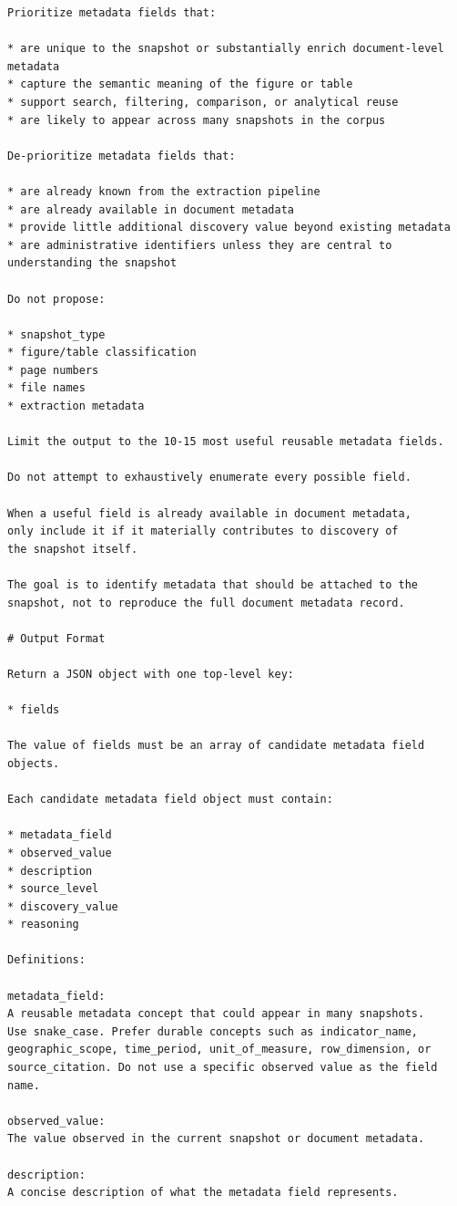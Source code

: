 \documentclass{article}
\begin{document}
\begin{lstlisting}
Prioritize metadata fields that:

* are unique to the snapshot or substantially enrich document-level metadata
* capture the semantic meaning of the figure or table
* support search, filtering, comparison, or analytical reuse
* are likely to appear across many snapshots in the corpus

De-prioritize metadata fields that:

* are already known from the extraction pipeline
* are already available in document metadata
* provide little additional discovery value beyond existing metadata
* are administrative identifiers unless they are central to understanding the snapshot

Do not propose:

* snapshot_type
* figure/table classification
* page numbers
* file names
* extraction metadata

Limit the output to the 10-15 most useful reusable metadata fields.

Do not attempt to exhaustively enumerate every possible field.

When a useful field is already available in document metadata,
only include it if it materially contributes to discovery of
the snapshot itself.

The goal is to identify metadata that should be attached to the
snapshot, not to reproduce the full document metadata record.

# Output Format

Return a JSON object with one top-level key:

* fields

The value of fields must be an array of candidate metadata field objects.

Each candidate metadata field object must contain:

* metadata_field
* observed_value
* description
* source_level
* discovery_value
* reasoning

Definitions:

metadata_field:
A reusable metadata concept that could appear in many snapshots.
Use snake_case. Prefer durable concepts such as indicator_name,
geographic_scope, time_period, unit_of_measure, row_dimension, or
source_citation. Do not use a specific observed value as the field name.

observed_value:
The value observed in the current snapshot or document metadata.

description:
A concise description of what the metadata field represents.


\end{lstlisting}
\end{document}
